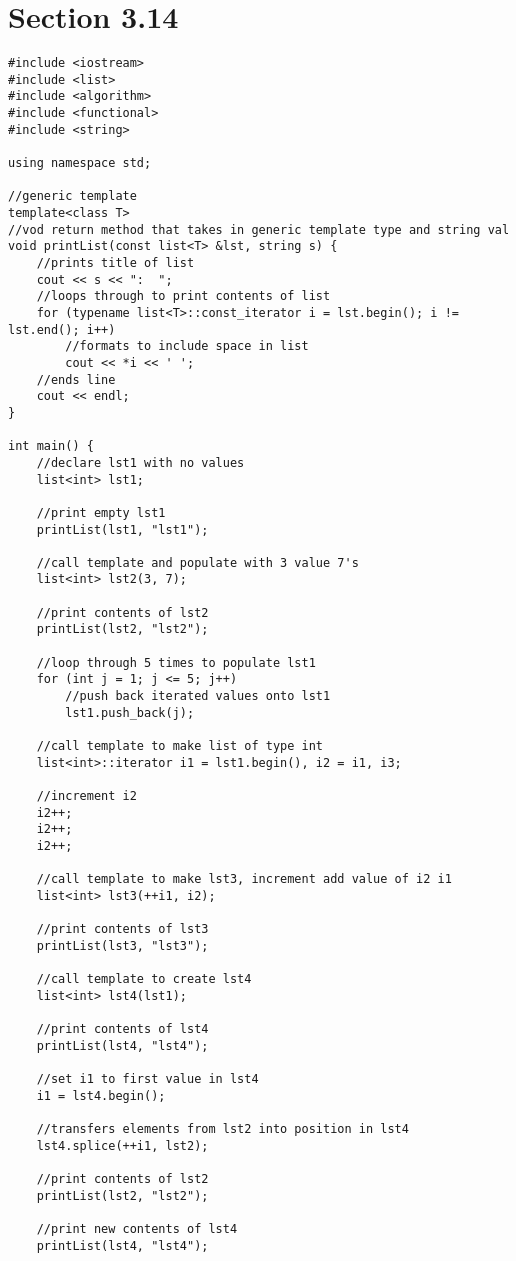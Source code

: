 \documentclass[11pt]{article}
\begin{document}
\section*{Section 3.14}
\begin{lstlisting}
#include <iostream>
#include <list>
#include <algorithm>
#include <functional>
#include <string>

using namespace std;

//generic template
template<class T>
//vod return method that takes in generic template type and string val
void printList(const list<T> &lst, string s) {
    //prints title of list
    cout << s << ":  ";
    //loops through to print contents of list
    for (typename list<T>::const_iterator i = lst.begin(); i != lst.end(); i++)
        //formats to include space in list
        cout << *i << ' ';
    //ends line
    cout << endl;
}

int main() {
    //declare lst1 with no values
    list<int> lst1;

    //print empty lst1
    printList(lst1, "lst1");

    //call template and populate with 3 value 7's
    list<int> lst2(3, 7);

    //print contents of lst2
    printList(lst2, "lst2");

    //loop through 5 times to populate lst1
    for (int j = 1; j <= 5; j++)
        //push back iterated values onto lst1
        lst1.push_back(j);

    //call template to make list of type int
    list<int>::iterator i1 = lst1.begin(), i2 = i1, i3;

    //increment i2
    i2++;
    i2++;
    i2++;

    //call template to make lst3, increment add value of i2 i1
    list<int> lst3(++i1, i2);

    //print contents of lst3
    printList(lst3, "lst3");

    //call template to create lst4
    list<int> lst4(lst1);

    //print contents of lst4
    printList(lst4, "lst4");

    //set i1 to first value in lst4
    i1 = lst4.begin();

    //transfers elements from lst2 into position in lst4
    lst4.splice(++i1, lst2);

    //print contents of lst2
    printList(lst2, "lst2");

    //print new contents of lst4
    printList(lst4, "lst4");


\end{lstlisting}
\end{document}
